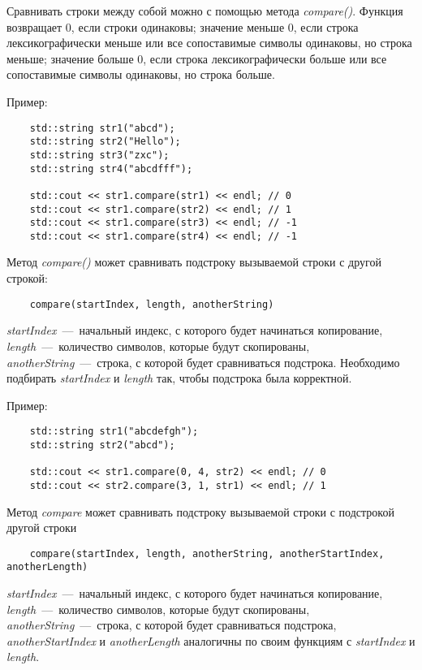Сравнивать строки между собой можно с помощью метода \textit{compare()}. Функция возвращает 0, если строки одинаковы; значение меньше 0, если строка лексикографически меньше или все сопоставимые символы одинаковы, но строка меньше; значение больше 0, если строка лексикографически больше или все сопоставимые символы одинаковы, но строка больше.

Пример:

\begin{lstlisting}
    std::string str1("abcd");
    std::string str2("Hello");
    std::string str3("zxc");
    std::string str4("abcdfff");
    
    std::cout << str1.compare(str1) << endl; // 0
    std::cout << str1.compare(str2) << endl; // 1
    std::cout << str1.compare(str3) << endl; // -1
    std::cout << str1.compare(str4) << endl; // -1
\end{lstlisting}

Метод \textit{compare()} может сравнивать подстроку вызываемой строки с другой строкой:
\begin{lstlisting}
    compare(startIndex, length, anotherString)
\end{lstlisting}

\textit{startIndex}~---~начальный индекс, с которого будет начинаться копирование, \textit{length}~---~количество символов, которые будут скопированы, \textit{anotherString}~---~строка, с которой будет сравниваться подстрока. Необходимо подбирать \textit{startIndex} и \textit{length} так, чтобы подстрока была корректной.

Пример:

\begin{lstlisting}
    std::string str1("abcdefgh");
    std::string str2("abcd");

    std::cout << str1.compare(0, 4, str2) << endl; // 0
    std::cout << str2.compare(3, 1, str1) << endl; // 1
\end{lstlisting}

Метод \textit{compare} может сравнивать подстроку вызываемой строки с подстрокой другой строки
\begin{lstlisting}
    compare(startIndex, length, anotherString, anotherStartIndex, anotherLength)
\end{lstlisting}

\textit{startIndex}~---~начальный индекс, с которого будет начинаться копирование, \textit{length}~---~количество символов, которые будут скопированы, \textit{anotherString}~---~строка, с которой будет сравниваться подстрока, \textit{anotherStartIndex} и \textit{anotherLength} аналогичны по своим функциям с \textit{startIndex} и \textit{length}.
